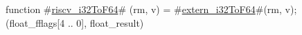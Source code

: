 function #\hyperref[sailRISCVzriscvzyi32ToF64]{riscv\_i32ToF64}# (rm, v) = {
  #\hyperref[sailRISCVzexternzyi32ToF64]{extern\_i32ToF64}#(rm, v);
  (float_fflags[4 .. 0], float_result)
}

